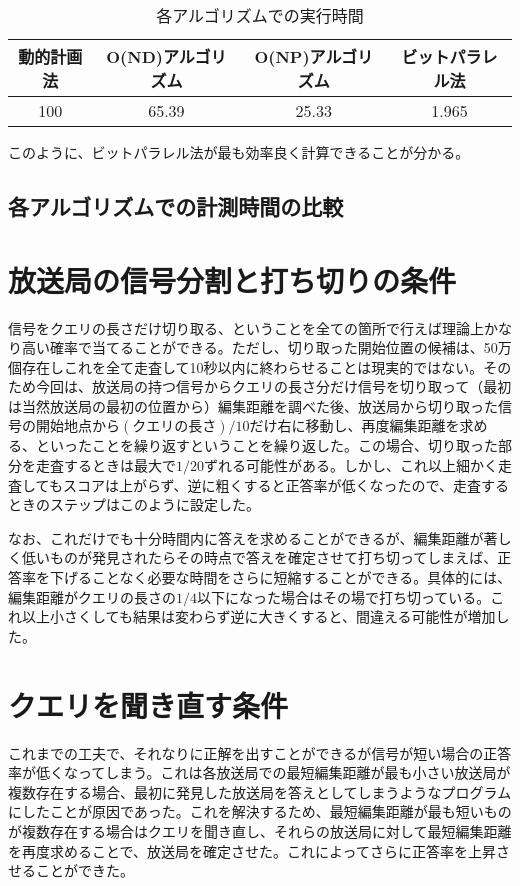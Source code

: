 \documentclass[dvipdfmx]{jsarticle}
\begin{document}
\begin{table}[htbp]
  \centering
  \begin{tabular}{c|c|c|c}
    動的計画法 & O(ND)アルゴリズム & O(NP)アルゴリズム & ビットパラレル法 \\ \hline\hline
    100 & 65.39 & 25.33 & 1.965 \\ \hline
  \end{tabular}
  \caption{各アルゴリズムでの実行時間}
\end{table}

このように、ビットパラレル法が最も効率良く計算できることが分かる。

\subsection{各アルゴリズムでの計測時間の比較}

\section{放送局の信号分割と打ち切りの条件}

信号をクエリの長さだけ切り取る、ということを全ての箇所で行えば理論上かなり高い確率で当てることができる。ただし、切り取った開始位置の候補は、50万個存在しこれを全て走査して10秒以内に終わらせることは現実的ではない。そのため今回は、放送局の持つ信号からクエリの長さ分だけ信号を切り取って（最初は当然放送局の最初の位置から）編集距離を調べた後、放送局から切り取った信号の開始地点から$(クエリの長さ)/10$だけ右に移動し、再度編集距離を求める、といったことを繰り返すということを繰り返した。この場合、切り取った部分を走査するときは最大で$1/20$ずれる可能性がある。しかし、これ以上細かく走査してもスコアは上がらず、逆に粗くすると正答率が低くなったので、走査するときのステップはこのように設定した。

なお、これだけでも十分時間内に答えを求めることができるが、編集距離が著しく低いものが発見されたらその時点で答えを確定させて打ち切ってしまえば、正答率を下げることなく必要な時間をさらに短縮することができる。具体的には、編集距離がクエリの長さの$1/4$以下になった場合はその場で打ち切っている。これ以上小さくしても結果は変わらず逆に大きくすると、間違える可能性が増加した。

\section{クエリを聞き直す条件}

これまでの工夫で、それなりに正解を出すことができるが信号が短い場合の正答率が低くなってしまう。これは各放送局での最短編集距離が最も小さい放送局が複数存在する場合、最初に発見した放送局を答えとしてしまうようなプログラムにしたことが原因であった。これを解決するため、最短編集距離が最も短いものが複数存在する場合はクエリを聞き直し、それらの放送局に対して最短編集距離を再度求めることで、放送局を確定させた。これによってさらに正答率を上昇させることができた。
\end{document}
